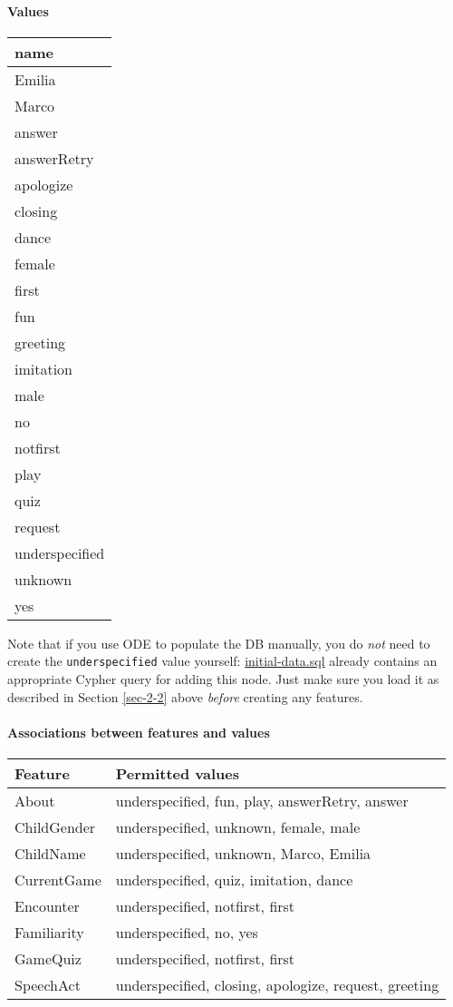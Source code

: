 \documentclass[11pt]{article}
\begin{document}
\paragraph{Values}
\label{sec-3-4-1-2}
\begin{center}
\begin{tabular}{l}
\hline
\textbf{name}\\
\hline
Emilia\\
Marco\\
answer\\
answerRetry\\
apologize\\
closing\\
dance\\
female\\
first\\
fun\\
greeting\\
imitation\\
male\\
no\\
notfirst\\
play\\
quiz\\
request\\
underspecified\\
unknown\\
yes\\
\hline
\end{tabular}
\end{center}

Note that if you use ODE to populate the DB manually, you do
\emph{not} need to create the \texttt{underspecified} value yourself:
\href{initial-data.cql}{initial-data.sql} already contains an appropriate Cypher query for
adding this node. Just make sure you load it as described in
Section \ref{sec-2-2} above \emph{before} creating any features.

\paragraph{Associations between features and values}
\label{sec-3-4-1-3}
\begin{center}
\begin{tabular}{ll}
\hline
\textbf{Feature} & \textbf{Permitted values}\\
\hline
About & underspecified, fun, play, answerRetry, answer\\
ChildGender & underspecified, unknown, female, male\\
ChildName & underspecified, unknown, Marco, Emilia\\
CurrentGame & underspecified, quiz, imitation, dance\\
Encounter & underspecified, notfirst, first\\
Familiarity & underspecified, no, yes\\
GameQuiz & underspecified, notfirst, first\\
SpeechAct & underspecified, closing, apologize, request, greeting\\
\hline
\end{tabular}
\end{center}
\end{document}
